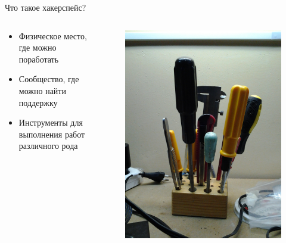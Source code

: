\documentclass[presentation]{beamer}
\begin{document}
\begin{frame}[label=sec-1-1-1]{Что такое хакерспейс?}
  \begin{columns}
    \begin{column}{0.5\textwidth}
      \begin{itemize}
      \item \alert{Физическое место}, где можно поработать
      \item \alert{Сообщество}, где можно найти поддержку
      \item \alert{Инструменты} для выполнения работ различного рода
      \end{itemize}
    \end{column}

    \begin{column}{0.5\textwidth}
      \begin{figure}[r]
        \includegraphics[width=.9\textwidth]{IMG_20150424_185329}
      \end{figure}
    \end{column}
  \end{columns}
\end{frame}
\end{document}

